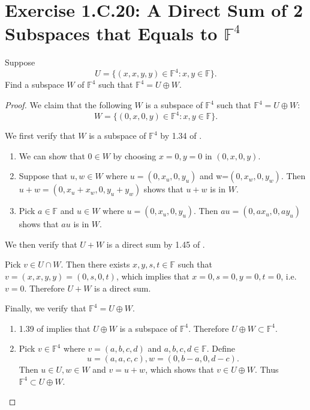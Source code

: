 \section{Exercise 1.C.20: A Direct Sum of 2 Subspaces that Equals to $\mathbb{F}^4$}
Suppose\[
U=\{(x,x,y,y)\in\mathbb{F}^4:x,y\in\mathbb{F}\}.
\]
Find a subspace $W$ of $\mathbb{F}^4$ such that $\mathbb{F}^4=U\oplus W$.
\begin{proof}
We claim that the following $W$ is a subspace of $\mathbb{F}^4$ such that $\mathbb{F}^4=U\oplus W$:
\[
W=\{(0,x,0,y)\in\mathbb{F}^4:x,y\in\mathbb{F}\}.
\]

We first verify that $W$ is a subspace of $\mathbb{F}^4$ by 1.34 of \cite{axler2014linear}.

\begin{enumerate}
\item We can show that $0\in W$ by choosing $x=0,y=0$ in $(0,x,0,y)$.
\item Suppose that $u,w\in W$ where $u=(0,x_u,0,y_u)$ and w=$(0,x_w,0,y_w)$. Then $u+w=(0,x_u+x_w,0,y_u+y_w)$ shows that $u+w$ is in $W$.
\item Pick $a\in\mathbb{F}$ and $u\in W$ where $u=(0,x_u,0,y_u)$. Then $au=(0,ax_u,0,ay_u)$ shows that $au$ is in $W$.
\end{enumerate}

We then verify that $U+W$ is a direct sum by 1.45 of \cite{axler2014linear}.

Pick $v\in U\cap W$. Then there exists $x,y,s,t\in\mathbb{F}$ such that $v=(x,x,y,y)=(0,s,0,t)$, which implies that $x=0, s=0, y=0, t=0$, i.e. $v=0$. Therefore $U+W$ is a direct sum.

Finally, we verify that $\mathbb{F}^4=U\oplus W$.

\begin{enumerate}
\item 1.39 of \cite{axler2014linear} implies that $U\oplus W$ is a subspace of $\mathbb{F}^4$. Therefore $U\oplus W\subset\mathbb{F}^4$.
\item Pick $v\in \mathbb{F}^4$ where $v=(a,b,c,d)$ and $a,b,c,d\in\mathbb{F}$. Define \[
u=(a,a,c,c), w=(0,b-a,0,d-c).
\]
Then $u\in U, w\in W$ and $v=u+w$, which shows that $v\in U\oplus W$. Thus $\mathbb{F}^4\subset U\oplus W$.
\end{enumerate}
\end{proof}

